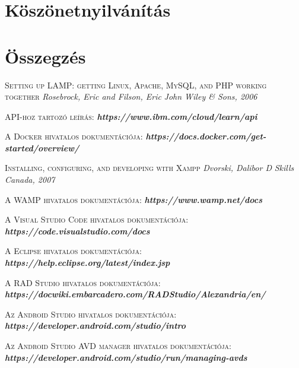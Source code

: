 \documentclass[
]{thesis-ekf}
\theoremstyle{definition}
\theoremstyle{remark}
\begin{document}
\chapter{Köszönetnyilvánítás}

\chapter*{Összegzés}

\begin{thebibliography}{2}

\textsc{Setting up LAMP: getting Linux, Apache, MySQL, and PHP working together}
\newline
\emph{Rosebrock, Eric and Filson, Eric}
\emph{John Wiley \& Sons, 2006}

\textsc{API-hoz tartozó leírás:}
\newline
\emph{\bf{https://www.ibm.com/cloud/learn/api}}

\textsc{A Docker hivatalos dokumentációja:}
\newline
\emph{\bf{https://docs.docker.com/get-started/overview/}}

\textsc{Installing, configuring, and developing with Xampp}
\newline
\emph{Dvorski, Dalibor D}
\emph{Skills Canada, 2007}

\textsc{A WAMP hivatalos dokumentációja:}
\newline
\emph{\bf{https://www.wamp.net/docs}}

\textsc{A Visual Studio Code hivatalos dokumentációja:}
\newline
\emph{\bf{https://code.visualstudio.com/docs}}

\textsc{A Eclipse hivatalos dokumentációja:}
\newline
\emph{\bf{https://help.eclipse.org/latest/index.jsp}}

\textsc{A RAD Studio hivatalos dokumentációja:}
\newline
\emph{\bf{https://docwiki.embarcadero.com/RADStudio/Alexandria/en/}}

\textsc{Az Android Studio hivatalos dokumentációja:}
\newline
\emph{\bf{https://developer.android.com/studio/intro}}

\textsc{Az Android Studio AVD manager hivatalos dokumentációja:}
\newline
\emph{\bf{https://developer.android.com/studio/run/managing-avds}}


\end{thebibliography}
\end{document}
